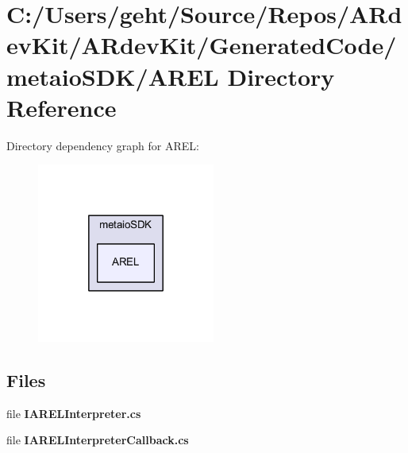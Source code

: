 \section{C\-:/\-Users/geht/\-Source/\-Repos/\-A\-Rdev\-Kit/\-A\-Rdev\-Kit/\-Generated\-Code/metaio\-S\-D\-K/\-A\-R\-E\-L Directory Reference}
\label{dir_1c7cb86e239f081baa67de640358bd53}
Directory dependency graph for A\-R\-E\-L\-:
\nopagebreak
\begin{figure}[H]
\begin{center}
\leavevmode
\includegraphics[width=166pt]{dir_1c7cb86e239f081baa67de640358bd53_dep}
\end{center}
\end{figure}
\subsection*{Files}
\begin{DoxyCompactItemize}
\item 
file {\bfseries I\-A\-R\-E\-L\-Interpreter.\-cs}
\item 
file {\bfseries I\-A\-R\-E\-L\-Interpreter\-Callback.\-cs}
\end{DoxyCompactItemize}
